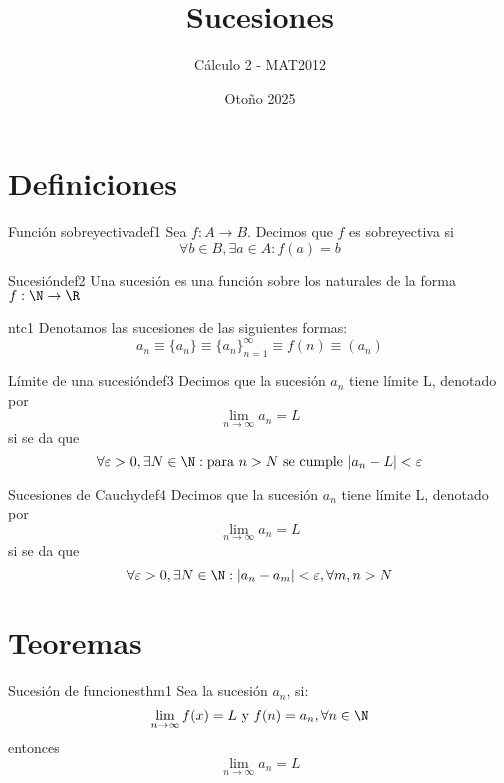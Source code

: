 \documentclass[12pt,a4paper]{article}
\title{\Huge Sucesiones}
\author{Cálculo 2 - MAT2012}
\date{Otoño 2025}
\begin{document}
\maketitle

\section{Definiciones}

\begin{definicion}{Función sobreyectiva}{def1}
    Sea $f: A \to B$. Decimos que $f$ es sobreyectiva si 
    \[
        \forall b \in B, \exists a \in A: f(a) = b
    \]
\end{definicion}

\begin{definicion}{Sucesión}{def2}
    Una sucesión es una función sobre los naturales de la forma $f: \N \to \R$ 
\end{definicion}

\begin{notacion}{}{ntc1}
    Denotamos las sucesiones de las siguientes formas:
    \[ 
        a_n \equiv \{a_n\} \equiv \{a_n\}_{n = 1}^{\infty} \equiv f(n) \equiv (a_n)
    \]
\end{notacion}
    
\begin{definicion}{Límite de una sucesión}{def3}
    Decimos que la sucesión $a_n$ tiene límite L, denotado por
    \[ 
        \lim_{n \to \infty} a_n = L
    \]
    si se da que 
    \[ 
        \forall \varepsilon > 0, \exists N \in \N: \text{para } n > N \text{ se cumple } \lvert a_n - L \rvert < \varepsilon
    \]
\end{definicion}

\begin{definicion}{Sucesiones de Cauchy}{def4}
    Decimos que la sucesión $a_n$ tiene límite L, denotado por
    \[ 
        \lim_{n \to \infty} a_n = L
    \]
    si se da que 
    \[ 
        \forall \varepsilon > 0, \exists N \in \N: \lvert a_n - a_m \rvert < \varepsilon, \forall m,n > N 
    \]
\end{definicion}

\section{Teoremas}

\begin{teorema}{Sucesión de funciones}{thm1}
    Sea la sucesión $a_n$, si:
    \[ 
        \lim_{n \to \infty} f(x) = L \text{ y } f(n) = a_n, \forall n \in \N
    \]
    entonces
    \[ 
        \lim_{n \to \infty} a_n = L
    \]
\end{teorema}
\end{document}

